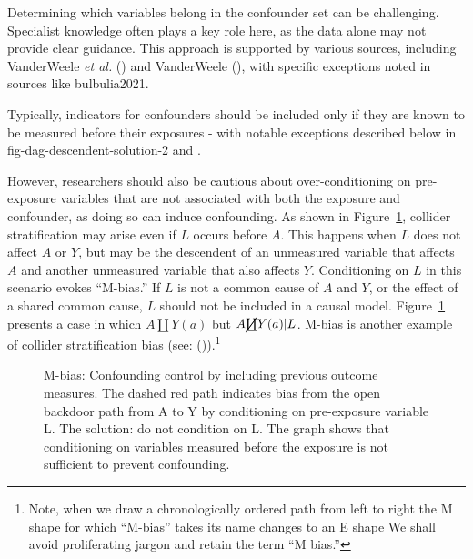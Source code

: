 \documentclass[
  singlecolumn,
  9pt]{article}
\begin{document}
Determining which variables belong in the confounder set can be
challenging. Specialist knowledge often plays a key role here, as the
data alone may not provide clear guidance. This approach is supported by
various sources, including VanderWeele \emph{et al.}
() and VanderWeele
(), with specific exceptions noted
in sources like bulbulia2021.

Typically, indicators for confounders should be included only if they
are known to be measured before their exposures - with notable
exceptions described below in fig-dag-descendent-solution-2 and .

However, researchers should also be cautious about over-conditioning on
pre-exposure variables that are not associated with both the exposure
and confounder, as doing so can induce confounding. As shown in
Figure~\ref{fig-m-bias}, collider stratification may arise even if \(L\)
occurs before \(A\). This happens when \(L\) does not affect \(A\) or
\(Y\), but may be the descendent of an unmeasured variable that affects
\(A\) and another unmeasured variable that also affects \(Y\).
Conditioning on \(L\) in this scenario evokes ``M-bias.'' If \(L\) is
not a common cause of \(A\) and \(Y\), or the effect of a shared common
cause, \(L\) should not be included in a causal model.
Figure~\ref{fig-m-bias} presents a case in which \(A \coprod Y(a)\) but
\(A \cancel{\coprod} Y(a)| L\). M-bias is another example of collider
stratification bias (see: ()).\footnote{Note, when we draw a chronologically ordered path from
  left to right the M shape for which ``M-bias'' takes its name changes
  to an E shape We shall avoid proliferating jargon and retain the term
  ``M bias.''}

\begin{figure}


\caption{\label{fig-m-bias}M-bias: Confounding control by including
previous outcome measures. The dashed red path indicates bias from the
open backdoor path from A to Y by conditioning on pre-exposure variable
L. The solution: do not condition on L. The graph shows that
conditioning on variables measured before the exposure is not sufficient
to prevent confounding.}

\end{figure}%
\end{document}
